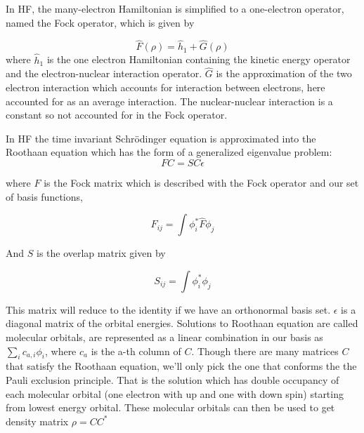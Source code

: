 \documentclass[twoside,11pt]{article}
\begin{document}


In HF, the many-electron Hamiltonian is simplified to a one-electron operator, named the Fock operator, which is given by

\[
\hat{F}(\rho) = \hat{h}_1 + \hat{G}(\rho)
\]
where $\hat{h}_1$ is the one electron Hamiltonian containing the kinetic energy operator and the electron-nuclear interaction operator. $\hat{G}$ is the approximation of the two electron interaction which accounts for interaction between electrons, here accounted for as an average interaction. The nuclear-nuclear interaction is a constant so not accounted for in the Fock operator. 

In HF the time invariant Schr\"{o}dinger equation is approximated into the Roothaan equation which has the form of a generalized eigenvalue problem:
\[
FC = SC\epsilon
\]



where $F$ is the Fock matrix which is described with the Fock operator and our set of basis functions,

\[
F_{ij} = \int \phi_i^*\hat{F}\phi_j
\]

And $S$ is the overlap matrix given by

\[
S_{ij} = \int \phi_i^*\phi_j
\]


This matrix will reduce to the identity if we have an orthonormal basis set. $\epsilon$ is a diagonal matrix of the orbital energies. 
Solutions to Roothaan equation are called molecular orbitals, are represented as a linear combination in our basis as $\sum_i c_{a,i}\phi_i$, where $c_{a}$ is the a-th column of $C$. 
Though there are many matrices $C$ that satisfy the Roothaan equation, 
we'll only pick the one that conforms the the Pauli exclusion principle.
That is the solution which has double occupancy of each molecular orbital (one electron with up and one with down spin) starting from lowest energy orbital. These molecular orbitals can then be used to get density matrix $\rho = CC^*$ 
\end{document}
